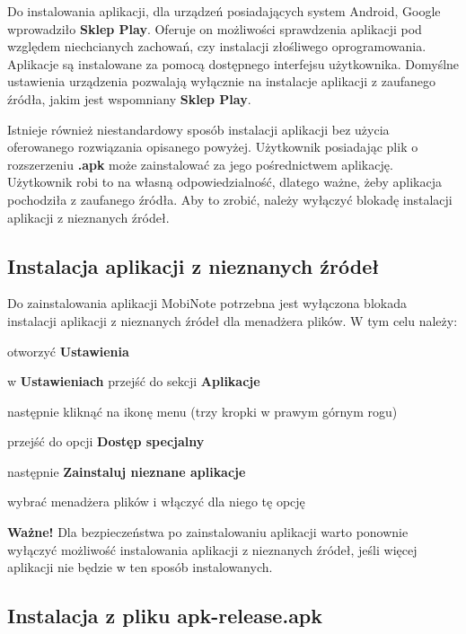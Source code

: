 \documentclass[shortabstract]{iithesis}
\begin{document}
 Do instalowania aplikacji, dla urządzeń posiadających system Android, Google wprowadziło \textbf{Sklep Play}. Oferuje on możliwości sprawdzenia aplikacji pod względem niechcianych zachowań, czy instalacji złośliwego oprogramowania. Aplikacje są instalowane za pomocą dostępnego interfejsu użytkownika. Domyślne ustawienia urządzenia pozwalają wyłącznie na instalacje aplikacji z zaufanego źródła, jakim jest wspomniany \textbf{Sklep Play}.

Istnieje również niestandardowy sposób instalacji aplikacji bez użycia oferowanego rozwiązania opisanego powyżej. Użytkownik posiadając plik o rozszerzeniu \textbf{.apk} może zainstalować za jego pośrednictwem aplikację. Użytkownik robi to na własną odpowiedzialność, dlatego ważne, żeby aplikacja pochodziła z zaufanego źródła. Aby to zrobić, należy wyłączyć blokadę instalacji aplikacji z nieznanych źródeł.

\subsection{Instalacja aplikacji z nieznanych źródeł}
Do zainstalowania aplikacji MobiNote potrzebna jest wyłączona blokada instalacji aplikacji z nieznanych źródeł dla menadżera plików.
W tym celu należy:
\begin{compactitem}
    \item otworzyć \textbf{Ustawienia}
    \item w \textbf{Ustawieniach} przejść do sekcji \textbf{Aplikacje}
    \item następnie kliknąć na ikonę menu (trzy kropki w prawym górnym rogu)
    \item przejść do opcji \textbf{Dostęp specjalny}
    \item następnie \textbf{Zainstaluj nieznane aplikacje}
    \item wybrać menadżera plików i włączyć dla niego tę opcję
\end{compactitem}

\textbf{Ważne!} Dla bezpieczeństwa po zainstalowaniu aplikacji warto ponownie wyłączyć możliwość instalowania aplikacji z nieznanych źródeł, jeśli więcej aplikacji nie będzie w ten sposób instalowanych.

\subsection{Instalacja z pliku apk-release.apk}
\end{document}
